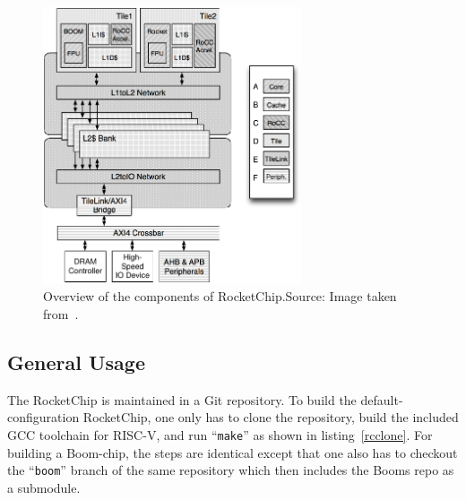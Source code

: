 \documentclass[journal,a4paper]{IEEEtran}
\newcommand{\source}[1]{Source: #1}
\begin{document}
\begin{figure}[!t]
	\centering
	\includegraphics[width=3in]{rcov}
	\caption{Overview of the components of RocketChip.\newline\hspace{\linewidth}\source{Image taken from~\cite{rcgen}}.}
	\label{rcov}
\end{figure}

\subsection{General Usage}
The RocketChip is maintained in a Git repository.
To build the default-configuration RocketChip, one only has to clone the repository, build the included GCC toolchain for RISC-V, and run ``\texttt{make}'' as shown in listing~\ref{rcclone}. For building a Boom-chip, the steps are identical except that one also has to checkout the ``\texttt{boom}'' branch of the same repository which then includes the Booms repo as a submodule.

\end{document}
